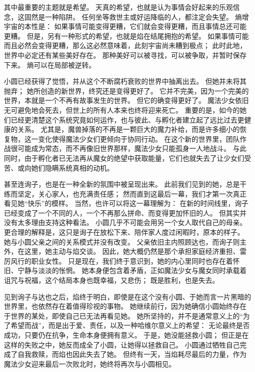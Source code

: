 其中最重要的主题就是希望。
天真的希望，也就是认为事情会好起来的乐观信念，这固然是一种陷阱。
任何坐等救世主或好运降临的人，都注定会失望。
熵增宇宙的本性是：
如果事情可能变得更糟，它们就会变得更糟，而且事情总还可能更糟。
但是，另有一种形式的希望，也就是焰在结尾拥抱的希望。
如果事情可能而且必然会变得更糟，那么这必然意味着，此刻宇宙尚未糟到极点；
此时此地，世界中必定还有某些美好存在。
那种美好可以被寻找，可以被争取，并暂时保存下来。
熵可以在局部被逆转。

小圆已经获得了觉悟，并从这个不断腐朽衰败的世界中抽离出去。
但她并未将其抛弃；
她所创造的新世界，终究还是变得更好了。
它并不完美，因为一个完美的世界，本就是一个不再有故事发生的世界。
但它的确变得更好了。
魔法少女依旧无可避免地会死去，但世上的所有人本来也终将迎来死亡。
重要的是，如今的她们已经更清楚这个系统究竟如何运作，也与彼此、与孵化者建立起了远比过去更健康的关系。
尤其是，魔兽掉落的不再是一颗巨大的魔力补给，而是许多细小的恢复物，这一变化使得魔法少女们更倾向于协同行动。
在这个新的世界里，团队作战很可能成为常态，而不再像旧世界那样，魔法少女只能孤身一人地战斗。
与此同时，由于孵化者已无法再从魔女的绝望中获取能量，它们也就失去了让少女们受苦、或向她们隐瞒系统真相的动机。

甚至连询子，也是在一种全新的氛围中被呈现出来。
此前我们见到的她，总是干练而坚定，关心家人，也充满责任感；
然而直到这最后一幕，我们才第一次真正看见她“快乐”的模样。
当然，也许可以将这一幕理解为：
在新的时间线里，询子已经变成了一个不同的人，一个不再那么拼命、而变得更加怀旧的人。
但其实并没有太多理由支持这种看法。
小圆几乎不可能会用另一个女人取代自己的母亲。
更合理的解释是，这只是询子在放松下来、陪伴家人度过闲暇时，原本的样子。
她与小圆父亲之间的关系模式并没有改变。
父亲依旧主内照顾达也，而询子则主外，在这里，她主动与焰交谈。
因此，她大概仍然是那个承担家庭经济重担、雷厉风行的职业女性。
只是现在，我们终于意识到，她的内心里同时也存在着怀旧、宁静与淡淡的怅惘。
她本身便包含着矛盾，正如魔法少女与魔女同时承载着诅咒与祝福，这个结局本身也既幸福，又悲伤；
既是胜利，也是失去。

见到询子与达也之后，焰终于明白，即使是在这个没有小圆、于她而言一片黑暗的世界里，也依然存在着值得珍视的事物。
她继续前行，因为她确信小圆始终存在于世界的某处，即使自己已无法再看见她。
她所坚持的，并不是通常意义上的“为了希望而战”，而是出于爱、责任，以及一种哈维尔意义上的希望：
无论最终是否成功，只要仍在抗争，生命本身便拥有意义。
于是，她没能拯救小圆；
但正是在这样的失败之中，她反而成全了小圆，让她得以拯救自己。
小圆通过牺牲自己完成了自我救赎，而焰也因此失去了她。
但终有一天，当焰耗尽最后的力量，作为魔法少女迎来最后一次败北时，她终将再次与小圆相见。

